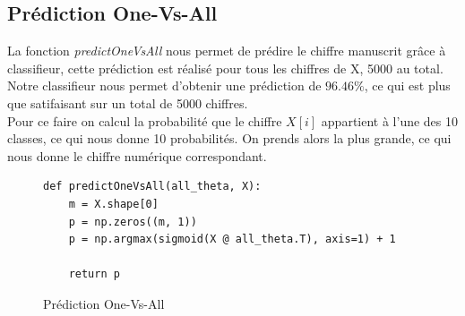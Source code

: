 \subsection{Prédiction One-Vs-All}

La fonction \textit{predictOneVsAll} nous permet de prédire le chiffre manuscrit grâce à classifieur, cette prédiction est réalisé pour tous les chiffres de X, 5000 au total. \\
Notre classifieur nous permet d'obtenir une prédiction de $96.46\%$, ce qui est plus que satifaisant sur un total de 5000 chiffres.\\


Pour ce faire on calcul la probabilité que le chiffre $X[i]$ appartient à l'une des 10 classes, ce qui nous donne 10 probabilités. On prends alors la plus grande, ce qui nous donne le chiffre numérique
correspondant.

\begin{figure}[!h]
\begin{verbatim}
def predictOneVsAll(all_theta, X):
    m = X.shape[0]
    p = np.zeros((m, 1))
    p = np.argmax(sigmoid(X @ all_theta.T), axis=1) + 1

    return p
\end{verbatim}   
\caption{Prédiction One-Vs-All}
\end{figure}
